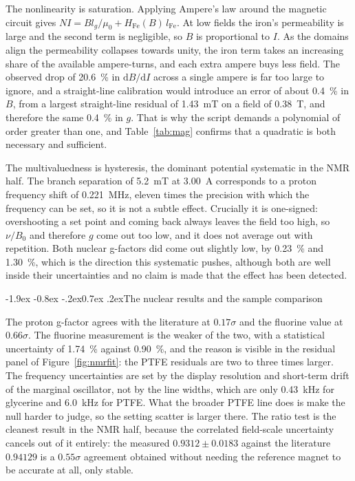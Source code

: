 \documentclass[11pt,a4paper]{article}
\makeatletter
\renewcommand\subsection{\@startsection{subsection}{2}{\z@}%
  {-1.9ex \@plus -0.8ex \@minus -.2ex}{0.7ex \@plus .2ex}{\normalfont\normalsize\bfseries}}
\makeatother
\begin{document}
The nonlinearity is saturation. Applying Ampere's law around the magnetic circuit gives
$NI = Bl_g/\mu_0 + H_{\mathrm{Fe}}(B)\,l_{\mathrm{Fe}}$. At low fields the iron's permeability is
large and the second term is negligible, so $B$ is proportional to $I$. As the domains align the
permeability collapses towards unity, the iron term takes an increasing share of the available
ampere-turns, and each extra ampere buys less field. The observed drop of \SI{20.6}{\percent} in
$\mathrm{d}B/\mathrm{d}I$ across a single ampere is far too large to ignore, and a straight-line
calibration would introduce an error of about \SI{0.4}{\percent} in $B$, from a largest
straight-line residual of \SI{1.43}{\milli\tesla} on a field of \SI{0.38}{\tesla}, and therefore
the same \SI{0.4}{\percent} in $g$. That is why
the script demands a polynomial of order greater than one, and Table~\ref{tab:mag} confirms that a
quadratic is both necessary and sufficient.

The multivaluedness is hysteresis, the dominant potential systematic in the NMR half. The branch
separation of \SI{5.2}{\milli\tesla} at \SI{3.00}{\ampere} corresponds to a proton frequency
shift of \SI{0.221}{\mega\hertz}, eleven times the precision with which the frequency can be set,
so it is not a subtle effect. Crucially it is one-signed: overshooting a set point and coming back
always leaves the field too high, so $\nu/B_0$ and therefore $g$ come out too low, and it does not
average out with repetition. Both nuclear g-factors did come out slightly low, by
\SI{0.23}{\percent} and \SI{1.30}{\percent}, which is the direction this systematic pushes,
although both are well inside their uncertainties and no claim is made that the effect has been
detected.

\subsection{The nuclear results and the sample comparison}

The proton g-factor agrees with the literature at $0.17\sigma$ and the fluorine value at
$0.66\sigma$. The fluorine measurement is the weaker of the two, with a statistical uncertainty of
\SI{1.74}{\percent} against \SI{0.90}{\percent}, and the reason is visible in the residual panel
of Figure~\ref{fig:nmrfit}: the PTFE residuals are two to three times larger. The frequency
uncertainties are set by the display resolution and short-term drift of the marginal oscillator,
not by the line widths, which are only \SI{0.43}{\kilo\hertz} for glycerine and
\SI{6.0}{\kilo\hertz} for PTFE. What the broader PTFE line does is make the null harder to judge,
so the setting scatter is larger there.
The ratio test is the cleanest result in the NMR half, because the
correlated field-scale uncertainty cancels out of it entirely: the measured $0.9312 \pm 0.0183$
against the literature $0.94129$ is a $0.55\sigma$ agreement obtained without needing the reference
magnet to be accurate at all, only stable.
\end{document}
